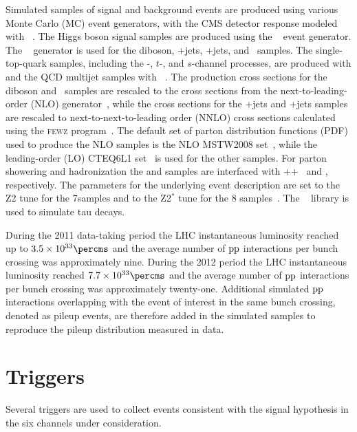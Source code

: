 \documentclass[12pt,twoside,a4paper,cmspaper,final,collab]{cms-tdr}
\begin{document}
Simulated samples of signal and background events are produced using
various Monte Carlo (MC) event generators, with the CMS detector response modeled
with \GEANTfour~\cite{GEANT4}. The Higgs boson signal samples are
produced using the {\POWHEG}~\cite{POWHEG} event generator.
The {}~\cite{Alwall:2011uj} generator is used for the diboson, \PW+jets, \cPZ+jets, and \ttbar\ samples.
The single-top-quark samples, including the \cPqt\PW-, $t$-, and $s$-channel processes, are produced with {\POWHEG} and the QCD
multijet samples with {}~\cite{Sjostrand:2006za}.  The production
cross sections for the diboson and \ttbar\ samples are rescaled to the
cross sections from the next-to-leading-order (NLO) {\MCFM} generator~\cite{Campbell:2010ff},
while the cross sections for the \PW+jets and \cPZ+jets samples are rescaled
to next-to-next-to-leading order (NNLO) cross sections calculated using the \textsc{fewz} program~\cite{Gavin:2010az,Li:2012wna,Gavin:2012sy}. The default set of parton distribution
functions (PDF) used to produce the NLO {\POWHEG} samples is
the NLO {MSTW2008} set~\cite{Martin:2009iq}, while the leading-order (LO)
CTEQ6L1 set~\cite{Pumplin:2002vw} is used for the other samples.
For parton showering and hadronization the {\POWHEG} and {\MADGRAPH} samples are interfaced with
 {\HERWIG++}~\cite{Bahr:2008pv} and  {\PYTHIA},
 respectively. The {\PYTHIA} parameters for the underlying event description are set to the Z2
tune for the 7\TeV samples and to the Z2$^*$ tune for the 8\TeV
samples~\cite{Chatrchyan:2011id}. The {\TAUOLA}~\cite{Jadach1991275} library is used to simulate tau decays.

During the 2011 data-taking period the LHC instantaneous luminosity reached up to $3.5\times 10^{33}\percms$ and
the average number of $\mathrm{p}\mathrm{p}$ interactions per bunch crossing was
approximately nine. During the 2012 period the LHC instantaneous luminosity
reached $7.7\times 10^{33}\percms$ and
the average number of $\mathrm{p}\mathrm{p}$ interactions per bunch crossing was
approximately twenty-one. Additional simulated $\mathrm{p}\mathrm{p}$ interactions overlapping with the event of interest in the same bunch crossing,
denoted as pileup events, are therefore added in the simulated samples to reproduce the pileup
distribution measured in data.


\section{Triggers}\label{sec:hbb_Triggers}


Several triggers are used to collect events consistent with
the signal hypothesis in the six channels under consideration.
\end{document}
